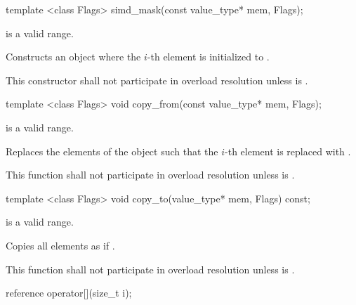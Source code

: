 \begin{itemdecl}
template <class Flags> simd_mask(const value_type* mem, Flags);
\end{itemdecl}
\begin{itemdescr}
  \flagsRequires{\mask{}}
  \code{[mem, mem + size())} is a valid range.

  \pnum\effects Constructs an object where the $i$-th element is initialized to  \foralli.

  \pnum\remarks This constructor shall not participate in overload resolution unless  is \true.
\end{itemdescr}

\begin{itemdecl}
template <class Flags> void copy_from(const value_type* mem, Flags);
\end{itemdecl}
\begin{itemdescr}
  \flagsRequires{\mask{}}
  \code{[mem, mem + size())} is a valid range.

  \pnum\effects Replaces the elements of the \mask object such that the $i$-th element is replaced with  \foralli.

  \pnum\remarks This function shall not participate in overload resolution unless  is \true.
\end{itemdescr}

\begin{itemdecl}
template <class Flags> void copy_to(value_type* mem, Flags) const;
\end{itemdecl}
\begin{itemdescr}
  \flagsRequires{\mask{}}
  \code{[mem, mem + size())} is a valid range.

  \pnum\effects Copies all \mask elements as if  \foralli.

  \pnum\remarks This function shall not participate in overload resolution unless  is \true.
\end{itemdescr}

\begin{itemdecl}
reference operator[](size_t i);
\end{itemdecl}
\begin{itemdescr}
  \simdElementReference{\mask{}}
\end{itemdescr}


